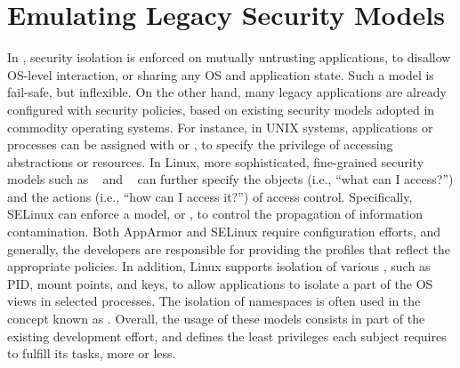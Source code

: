 

\section{Emulating Legacy Security Models}
\label{sec:future:security}


In \liboses{}, security isolation is enforced on mutually untrusting applications,
to disallow OS-level interaction,
or sharing any OS and application state.
Such a model is fail-safe, but inflexible.
On the other hand, many legacy applications are already
configured with security policies,
based on existing security models adopted in commodity operating systems.
For instance, in UNIX systems, applications or processes
can be assigned with  or ,
to specify the privilege of accessing abstractions or resources.
In Linux, more sophisticated, fine-grained security models
such as ~\citep{apparmor} and ~\citep{selinux}
can further specify the objects (i.e., ``what can I access?'')
and the actions (i.e., ``how can I access it?'') of access control.
Specifically, SELinux can enforce a  model, or ,
to control the propagation of information contamination.
Both AppArmor and SELinux require configuration efforts,
and generally, the developers are responsible for
providing the profiles
that reflect the appropriate policies.
In addition,
Linux supports isolation of various ,
such as PID, mount points, and \sysvipc{} keys, 
to allow applications to isolate a part of the OS views in selected processes.
The isolation of namespaces is often used in the concept known as .
Overall, the usage of these models consists in
part of the existing development effort,
and defines the least privileges each subject requires
to fulfill its tasks, more or less.


